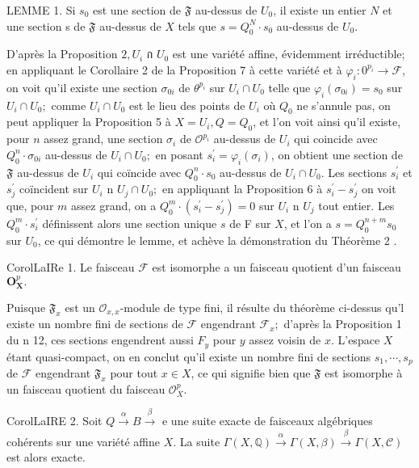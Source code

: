 LEMME 1. Si $s_{0}$ est une section de $\mathfrak{F}$ au-dessus de $U_{0}$, il existe un entier $N$ et une section s de $\mathfrak{F}$ au-dessus de $X$ tels que $s=Q_{0}^{N} \cdot s_{0}$ au-dessus de $U_{0}$.

D'après la Proposition $2, U_{i}$ ก $U_{0}$ est une variété affine, évidemment irréductible; en appliquant le Corollaire 2 de la Proposition 7 à cette variété et à $\varphi_{i}: 0^{p_{i}} \rightarrow \mathscr{F}$, on voit qu'il existe une section $\sigma_{0 i}$ de $\theta^{p_{i}}$ sur $U_{i} \cap U_{0}$ telle que $\varphi_{i}\left(\sigma_{0 i}\right)=s_{0}$ sur $U_{i} \cap U_{0} ;$ comme $U_{i} \cap U_{0}$ est le lieu des points de $U_{i}$ où $Q_{0}$ ne s'annule pas, on peut appliquer la Proposition 5 à $X=U_{i}, Q=Q_{0}$, et l'on voit ainsi qu'il existe, pour $n$ assez grand, une section $\sigma_{i}$ de $\mathcal{O}^{p_{i}}$ au-dessus de $U_{i}$ qui coincide avec $Q_{0}^{n} \cdot \sigma_{0 i}$ au-dessus de $U_{i} \cap U_{0} ;$ en posant $s_{i}^{\prime}=\varphi_{i}\left(\sigma_{i}\right)$, on obtient une section de $\mathfrak{F}$ au-dessus de $U_{i}$ qui coïncide avec $Q_{0}^{n} \cdot s_{0}$ au-dessus de $U_{i} \cap U_{0} .$ Les sections $s_{i}^{\prime}$ et $s_{j}^{\prime}$ coïncident sur $U_{i}$ n $U_{j} \cap U_{0} ;$ en appliquant la Proposition 6 à $s_{i}^{\prime}-s_{j}^{\prime}$ on voit que, pour $m$ assez grand, on a $Q_{0}^{m} \cdot\left(s_{i}^{\prime}-s_{j}^{\prime}\right)=0$ sur $U_{i}$ n $U_{j}$ tout entier. Les $Q_{0}^{m} \cdot s_{i}^{\prime}$ définissent alors une section unique $s$ de F sur $X$, et l'on a $s=Q_{0}^{n+m} s_{0}$ sur $U_{0}$, ce qui démontre le lemme, et achève la démonstration du Théorème 2 .

CorolLaIRe 1. Le faisceau $\mathcal{F}$ est isomorphe a un faisceau quotient d'un faisceau $\boldsymbol{O}_{\mathbf{X}}^{p} .$

Puisque $\mathfrak{F}_{x}$ est un $\mathcal{O}_{x, x}$-module de type fini, il résulte du théorème ci-dessus qu'l existe un nombre fini de sections de $\mathcal{F}$ engendrant $\mathcal{F}_{x} ;$ d'après la Proposition 1 du n 12, ces sections engendrent aussi $F_{y}$ pour $y$ assez voisin de $x .$ L'espace $X$ étant quasi-compact, on en conclut qu'il existe un nombre fini de sections $s_{1}, \cdots, s_{p}$ de $\mathcal{F}$ engendrant $\mathfrak{F}_{x}$ pour tout $x \in X$, ce qui signifie bien que $\mathfrak{F}$ est isomorphe à un faisceau quotient du faisceau $\mathcal{O}_{X}^{p}$.

CorolLaIRE 2. Soit $Q \stackrel{\alpha}{\rightarrow} B \stackrel{\beta}{\rightarrow}$ e une suite exacte de faisceaux algébriques cohérents sur une variété affine $X .$ La suite $\Gamma(X, \mathbb{Q}) \stackrel{\alpha}{\rightarrow} \Gamma(X, \beta) \stackrel{\beta}{\rightarrow} \Gamma(X, \mathcal{C})$ est alors exacte.

